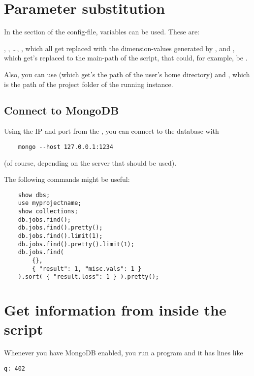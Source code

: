 \documentclass[]{scrartcl}
\begin{document}
\section{Parameter substitution}

\label{parametersubstitution}

In the  section of the config-file, variables can be used. These are:

, , \dots, , which all get replaced with the dimension-values generated
by , and , which get's replaced to the main-path of the script, that could, for example, be
.

Also, you can use  (which get's the path of the user's home directory) and , which
is the path of the project folder of the running instance.

\subsection{Connect to MongoDB}

Using the IP and port from the , you can connect to the database with

\begin{verbatim}
    mongo --host 127.0.0.1:1234
\end{verbatim}

(of course, depending on the server that should be used).

The following commands might be useful:

\begin{verbatim}
    show dbs;
    use myprojectname;
    show collections;
    db.jobs.find();
    db.jobs.find().pretty();
    db.jobs.find().limit(1);
    db.jobs.find().pretty().limit(1);
    db.jobs.find(
        {}, 
        { "result": 1, "misc.vals": 1 }
    ).sort( { "result.loss": 1 } ).pretty();
\end{verbatim}

\section{Get information from inside the script}

Whenever you have MongoDB enabled, you run a program and it has lines like

\begin{verbatim}
q: 402
\end{verbatim}
\end{document}
